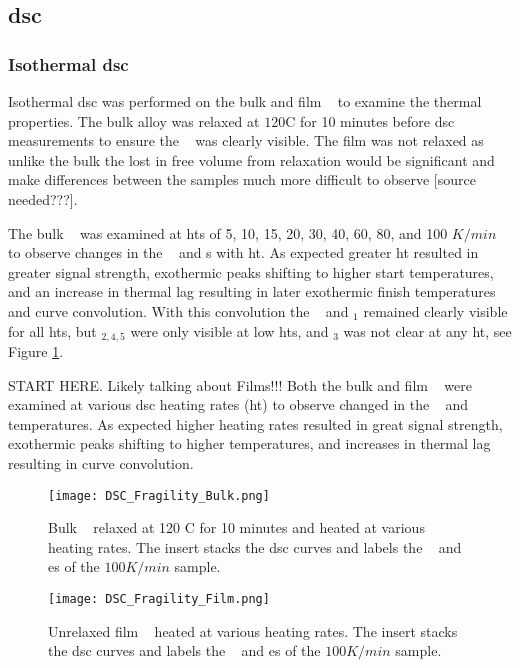\documentclass[a4paper,12pt,oneside]{article}%
\begin{document}
\subsection{\acrshort{dsc}}
\subsubsection{Isothermal \acrshort{dsc}}
Isothermal \acrshort{dsc} was performed on the bulk and film \MgZnCa~ to examine the thermal properties. The bulk alloy was relaxed at $120$\degree C for 10 minutes before \acrshort{dsc} measurements to ensure the \Tg~ was clearly visible. The film was not relaxed as unlike the bulk the lost in free volume from relaxation would be significant and make differences between the samples much more difficult to observe [source needed???]. 

The bulk \MgZnCa~ was examined at \glspl{ht} of 5, 10, 15, 20, 30, 40, 60, 80, and 100 $K/min$ to observe changes in the \Tg~ and \Tx s with \gls{ht}. As expected greater \gls{ht} resulted in greater signal strength, exothermic peaks shifting to higher start temperatures, and an increase in thermal lag resulting in later exothermic finish temperatures and curve convolution. With this convolution the \Tg~ and \Tx $_{1}$  remained clearly visible for all \glspl{ht}, but \Tx $_{2,4,5}$ were only visible at low \glspl{ht}, and \Tx $_{3}$ was not clear at any \gls{ht}, see Figure \ref{fig:DSC_vHeatingRate_Bulk}.


START HERE. Likely talking about Films!!!
Both the bulk and film \MgZnCa~ were examined at various \acrshort{dsc} heating rates (\acrshort{ht}) to observe changed in the \Tg~ and \Tx~ temperatures. As expected higher heating rates resulted in great signal strength, exothermic peaks shifting to higher temperatures, and increases in thermal lag resulting in curve convolution. 


\begin{figure}[b]
	\centering
	\texttt{[image: DSC\_Fragility\_Bulk.png]}
	\caption[Table of contents Capition]{Bulk \MgZnCa~ relaxed at 120 \degree C for 10 minutes and heated at various heating rates. The insert stacks the \gls{dsc} curves and labels the \Tg~ and \Tx es of the $100 K/min$ sample.}%
	\label{fig:DSC_vHeatingRate_Bulk}
\end{figure}

\begin{figure}[b]
	\centering
	\texttt{[image: DSC\_Fragility\_Film.png]}
	\caption[Table of contents Capition]{Unrelaxed film \MgZnCa~ heated at various heating rates. The insert stacks the \gls{dsc} curves and labels the \Tg~ and \Tx es of the $100 K/min$ sample.}%
	\label{fig:DSC_vHeatingRate_Film}
\end{figure}
\end{document}
